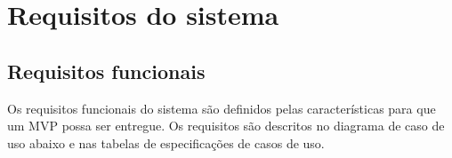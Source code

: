 \chapter{Requisitos do sistema}

\section{Requisitos funcionais}

Os requisitos funcionais do sistema são definidos pelas características para que um MVP possa ser entregue.
Os requisitos são descritos no diagrama de caso de uso abaixo e nas tabelas de especificações de casos de uso.
